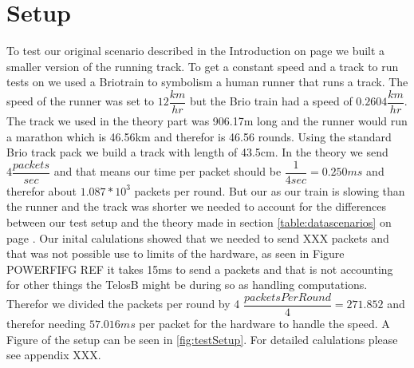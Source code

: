 \section{Setup}\label{sc:setup}
To test our original scenario described in the Introduction on page \pageref{ch:introduction} we built a smaller version of the running track. To get a constant speed and a track to run tests on we used a Brio\texttrademark train to symbolism a human runner that runs a track. The speed of the runner was set to $12\dfrac{km}{hr}$ but the Brio train had a speed of $0.2604\dfrac{km}{hr}$. The track we used in the theory part was 906.17m long and the runner would run a marathon which is 46.56km and therefor is 46.56 rounds. Using the standard Brio track pack we build a track with length of 43.5cm. In the theory we send $4\dfrac{packets}{sec}$ and that means our time per packet should be $\dfrac{1}{4sec} = 0.250ms$ and therefor about $1.087*10^3$ packets per round. But our as our train is slowing than the runner and the track was shorter we needed to account for the differences between our test setup and the theory made in section \ref{table:datascenarios} on page \pageref{table:scenarios}. Our inital calulations showed that we needed to send XXX packets and that was not possible use to limits of the hardware, as seen in Figure POWERFIFG REF it takes 15ms to send a packets and that is not accounting for other things the TelosB might be during so as handling computations. Therefor we divided the packets per round by 4 $ \dfrac{packetsPerRound}{4} = 271.852 $ and therefor needing $57.016 ms$ per packet for the hardware to handle the speed. A Figure of the setup can be seen in \ref{fig:testSetup}. For detailed calulations please see appendix XXX.